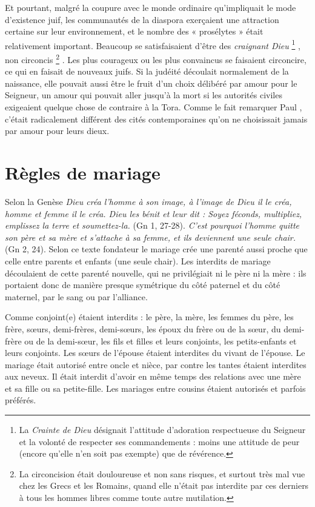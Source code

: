  Et pourtant, malgré la coupure avec le monde ordinaire qu'impliquait le mode d'existence juif, les communautés de la diaspora exerçaient une attraction certaine sur leur environnement, et le nombre des « prosélytes » était relativement important. Beaucoup se satisfaisaient d'être des \emph{craignant Dieu}%
\footnote{La \emph{Crainte de Dieu} désignait l'attitude d'adoration respectueuse du Seigneur et la volonté de respecter ses commandements : moins une attitude de peur (encore qu'elle n'en soit pas exempte) que de révérence.}%
, non circoncis%
\footnote{La circoncision était douloureuse et non sans risques, et surtout très mal vue chez les Grecs et les Romains, quand elle n'était pas interdite par ces derniers à tous les hommes libres comme toute autre mutilation.}%
. Les plus courageux ou les plus convaincus se faisaient circoncire, ce qui en faisait de nouveaux juifs. Si la judéité découlait normalement de la naissance, elle pouvait aussi être le fruit d'un choix délibéré par amour pour le Seigneur, un amour qui pouvait aller jusqu'à la mort si les autorités civiles exigeaient quelque chose de contraire à la Tora. Comme le fait remarquer Paul , c'était radicalement différent des cités contemporaines qu'on ne choisissait jamais par amour pour leurs dieux.

 
 
 
\section{Règles de mariage}

 
 
 Selon la Genèse \emph{Dieu créa l'homme à son image, à l'image de Dieu il le créa, homme et femme il le créa. Dieu les bénit et leur dit : Soyez féconds, multipliez, emplissez la terre et soumettez-la.} (Gn 1, 27-28). \emph{C'est pourquoi l'homme quitte son père et sa mère et s'attache à sa femme, et ils deviennent une seule chair.} (Gn 2, 24). Selon ce texte fondateur le mariage crée une parenté aussi proche que celle entre parents et enfants (une seule chair). Les interdits de mariage découlaient de cette parenté nouvelle, qui ne privilégiait ni le père ni la mère : ils portaient donc de manière presque symétrique du côté paternel et du côté maternel, par le sang ou par l'alliance.
 
 Comme conjoint(e) étaient interdits : le père, la mère, les femmes du père, les frère, sœurs, demi-frères, demi-sœurs, les époux du frère ou de la sœur, du demi-frère ou de la demi-sœur, les fils et filles et leurs conjoints, les petits-enfants et leurs conjoints. Les sœurs de l'épouse étaient interdites du vivant de l'épouse. Le mariage était autorisé entre oncle et nièce, par contre les tantes étaient interdites aux neveux. Il était interdit d'avoir en même temps des relations avec une mère et sa fille ou sa petite-fille. Les mariages entre cousins étaient autorisés et parfois préférés. 
 
